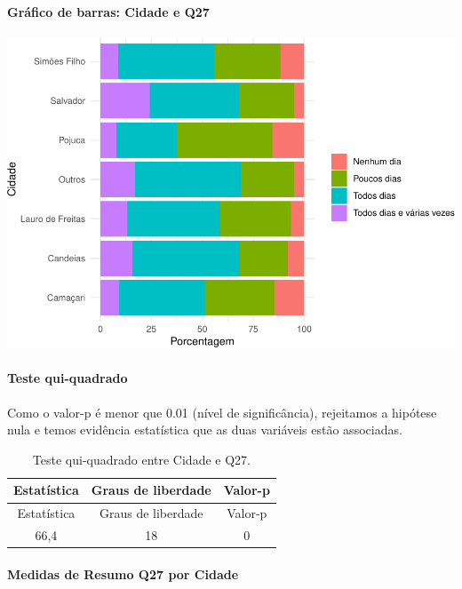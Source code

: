 \documentclass[]{article}
\let\oldparagraph\paragraph
\renewcommand{\paragraph}[1]{\oldparagraph{#1}\mbox{}}
\begin{document}
\hypertarget{gruxe1fico-de-barras-cidade-e-q27}{%
\paragraph{Gráfico de barras: Cidade e Q27}\label{gruxe1fico-de-barras-cidade-e-q27}}

\begin{center}\includegraphics[width=0.75\linewidth]{relatorio_covid19_files/figure-latex/unnamed-chunk-780-1} \end{center}

\hypertarget{teste-qui-quadrado-67}{%
\paragraph{Teste qui-quadrado}\label{teste-qui-quadrado-67}}

Como o valor-p é menor que 0.01 (nível de significância), rejeitamos a hipótese nula e temos evidência estatística que as duas variáveis estão associadas.

\begin{longtable}[]{@{}ccc@{}}
\caption{\label{tab:unnamed-chunk-782}Teste qui-quadrado entre Cidade e Q27.}\tabularnewline
\toprule
Estatística & Graus de liberdade & Valor-p\tabularnewline
\midrule
\endfirsthead
\toprule
Estatística & Graus de liberdade & Valor-p\tabularnewline
\midrule
\endhead
66,4 & 18 & 0\tabularnewline
\bottomrule
\end{longtable}

\cleardoublepage

\hypertarget{medidas-de-resumo-q27-por-cidade}{%
\paragraph{Medidas de Resumo Q27 por Cidade}\label{medidas-de-resumo-q27-por-cidade}}
\end{document}
